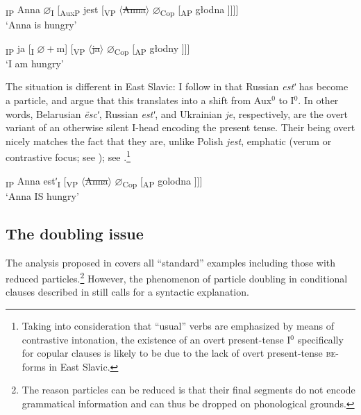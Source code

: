 \documentclass[output=paper]{langscibook}
\begin{document}
\ea {[}\textsubscript{IP} Anna $\varnothing$\textsubscript{I} [\textsubscript{AuxP} jest [\textsubscript{VP} $\langle$\sout{Anna}$\rangle$ $\varnothing$\textsubscript{Cop} [\textsubscript{AP} głodna ]]]]\\`Anna is hungry'
\label{pitsch:ex:CopPol_3PS}
\z

\ea {[}\textsubscript{IP} ja [\textsubscript{I} $\varnothing+$m] [\textsubscript{VP} $\langle$\sout{ja}$\rangle$ $\varnothing$\textsubscript{Cop} [\textsubscript{AP} głodny ]]]\\`I am hungry' \label{pitsch:ex:CopPol_Silent}
\z

\noindent The situation is different in East Slavic: I follow \citet{Issatchenko1940} in that Russian \textit{estʹ} has become a particle, and argue that this translates into a shift from Aux$^0$ to I$^0$. In other words, Belarusian \textit{ëscʹ}, Russian \textit{estʹ}, and Ukrainian \textit{je}, respectively, are the overt variant of an otherwise silent I-head encoding the present tense. Their being overt nicely matches the fact that they are, unlike Polish \textit{jest}, emphatic (verum or contrastive focus; see \citealt[127]{Geist2007}); see .\footnote{Taking into consideration that ``usual'' verbs are emphasized by means of contrastive intonation, the existence of an overt present-tense I$^0$ specifically for copular clauses is likely to be due to the lack of overt present-tense \textsc{be}-forms in East Slavic.}

\ea {[}\textsubscript{IP} Anna estʹ\textsubscript{I} [\textsubscript{VP} $\langle$\sout{Anna}$\rangle$ $\varnothing$\textsubscript{Cop} [\textsubscript{AP} golodna ]]]\\`Anna IS hungry'
\label{pitsch:ex:CopEast}
\z


\subsection{The doubling issue}\label{pitsch:sec:doubling_analysis}

The analysis proposed in  covers all ``standard'' examples including those with reduced particles.\footnote{The reason particles can be reduced is that their final segments do not encode grammatical information and can thus be dropped on phonological grounds.} However, the phenomenon of particle doubling in conditional clauses described in  still calls for a syntactic explanation. 
\end{document}
